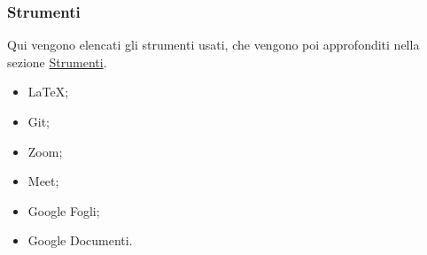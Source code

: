 \subsubsection{Strumenti}
Qui vengono elencati gli strumenti usati, che vengono poi approfonditi nella sezione \hyperref[sec:strumenti]{Strumenti}.
\begin{itemize}
    \item LaTeX;
    \item Git;
    \item Zoom;
    \item Meet;
    \item Google Fogli;
    \item Google Documenti.
\end{itemize}
